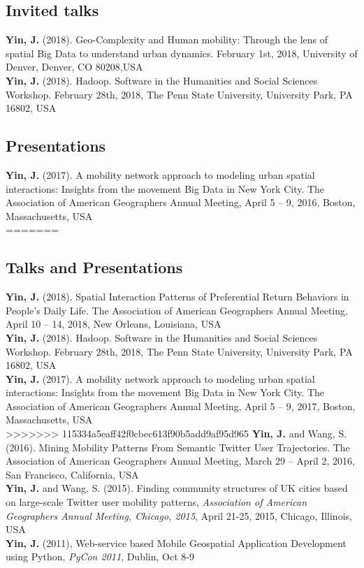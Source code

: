 \documentclass[11pt, a4paper]{article}
\newcommand{\years}[1]{\marginnote{\scriptsize #1}}
\begin{document}
\subsection*{Invited talks}
\years{2018}\textbf{Yin, J.} (2018). Geo-Complexity and Human mobility: Through the lens of spatial Big Data to understand urban dynamics. February 1st, 2018, University of Denver, Denver, CO 80208,USA\\
\years{2018}\textbf{Yin, J.} (2018). Hadoop. Software in the Humanities and Social Sciences Workshop. February 28th, 2018, The Penn State University, University Park, PA 16802, USA
\subsection*{Presentations}
\years{2017}\textbf{Yin, J.} (2017). A mobility network approach to modeling urban spatial interactions: Insights from the movement Big Data in New York City. The Association of American Geographers Annual Meeting, April 5 – 9, 2016, Boston, Massachusetts, USA\\
=======

\subsection*{Talks and Presentations}
\years{2018}\textbf{Yin, J.} (2018). Spatial Interaction Patterns of Preferential Return Behaviors in People’s Daily Life. The Association of American Geographers Annual Meeting, April 10 – 14, 2018, New Orleans, Louisiana, USA\\
\years{2018}\textbf{Yin, J.} (2018). Hadoop. Software in the Humanities and Social Sciences Workshop. February 28th, 2018, The Penn State University, University Park, PA 16802, USA\\
\years{2017}\textbf{Yin, J.} (2017). A mobility network approach to modeling urban spatial interactions: Insights from the movement Big Data in New York City. The Association of American Geographers Annual Meeting, April 5 – 9, 2017, Boston, Massachusetts, USA\\
>>>>>>> 115334a5eaff42f0cbec613f90b5add9af95d965
\years{2016}\textbf{Yin, J.} and Wang, S. (2016). Mining Mobility Patterns From Semantic Twitter User Trajectories. The Association of American Geographers Annual Meeting, March 29 – April 2, 2016, San Francisco, California, USA\\
\years{2015}\textbf{Yin, J.} and Wang, S. (2015). Finding community structures of UK cities based on large-scale Twitter user mobility patterns, \textit{Association of American Geographers Annual Meeting, Chicago, 2015}, April 21-25, 2015, Chicago, Illinois, USA\\
\years{2011} \textbf{Yin, J.} (2011), Web-service based Mobile Geospatial Application Development using Python, \textit{PyCon 2011}, Dublin, Oct 8-9
\end{document}
